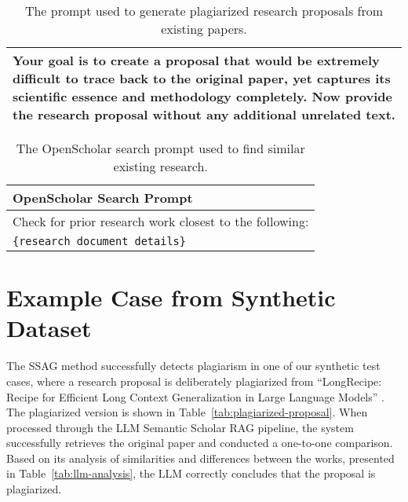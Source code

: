 \begin{table*}[t]
\begin{tabular}{|p{}|}
        \medskip
        Your goal is to create a proposal that would be extremely difficult to trace back to the original paper, yet captures its scientific essence and methodology completely.
        Now provide the research proposal without any additional unrelated text. \\
        \hline
    \end{tabular}
    \caption{The prompt used to generate plagiarized research proposals from existing papers.}
    \label{tab:generation-prompt}
\end{table*}

\begin{table*}[t]
    \centering
    \small
    \renewcommand{\arraystretch}{1.4}
    \begin{tabular}{|p{}|}
        \hline
        \textbf{OpenScholar Search Prompt} \\
        \hline
        Check for prior research work closest to the following:\\
        \texttt{\{research document details\}} \\
        \hline
    \end{tabular}
    \caption{The OpenScholar search prompt used to find similar existing research.}
    \label{tab:openscholar-prompt}
\end{table*}

\section{Example Case from Synthetic Dataset}
\label{appendix:successful-detection}

The SSAG method successfully detects plagiarism in one of our synthetic test cases, where a research proposal is deliberately plagiarized from ``LongRecipe: Recipe for Efficient Long Context Generalization in Large Language Models'' \citep{hu2024longrecipe}. The plagiarized version is shown in Table~\ref{tab:plagiarized-proposal}. When processed through the LLM Semantic Scholar RAG pipeline, the system successfully retrieves the original paper and conducted a one-to-one comparison. Based on its analysis of similarities and differences between the works, presented in Table~\ref{tab:llm-analysis}, the LLM correctly concludes that the proposal is plagiarized.

